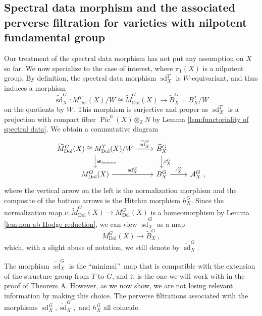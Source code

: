 \documentclass[11pt, a4paper]{amsart}
\theoremstyle{definition}
\theoremstyle{myitemstyle}
\newcommand{\mc}[1]{{\mathcal{#1}}}
\DeclareMathOperator{\Pic}{Pic}
\newcommand{\Dol}{{\mathrm{Dol}}}
\newcommand{\sd}{{\operatorname{sd}}}
\begin{document}
\subsection{Spectral data morphism and the  associated perverse filtration for varieties with nilpotent fundamental group}

Our treatment of the spectral data morphism has not put  any assumption on $X$ so far. We now specialize to the case of interest, where $\pi_1(X)$ is a nilpotent group. By definition, the spectral data morphism $\sd^T_X$ is $W$-equivariant, and thus induces a morphism 
\[
    \widetilde\sd_X^G\colon M^T_\Dol(X)/W\cong \widetilde M_{\Dol}^G(X) \rightarrow \widetilde B^G_X=B^T_X/W 
\]
on the quotients by $W$. This morphism is surjective and proper as $\sd^T_X$ is a projection with compact fiber $\Pic^0(X)\otimes_{\mathbb{Z}}N$ by Lemma \ref{lem:functoriality of spectral data}. 
We obtain a commutative diagram 
\begin{equation}
	\label{eq:spectral data diagram}
	\begin{tikzcd}
		\widetilde M^G_\Dol(X)\cong M^T_\Dol(X)/W
		\arrow[r,"\widetilde\sd^G_X"]
		\arrow[d,"\cong_{homeo}"]&
		\widetilde B^G_X
		\arrow[d,"\beta^G_X"]&\\
		M^G_\Dol(X)
		\arrow[r,"\sd^G_X"]&
		B^G_X
		\arrow[r,"\iota^G_X"]&
		\mc A^G_X\ ,
	\end{tikzcd}
\end{equation}
where the vertical arrow on the left is the normalization morphism and the composite of the bottom arrows is the Hitchin morphism $h_X^G$. 
Since the normalization map $\nu\colon \widetilde M_{\Dol}^G(X) \to M_{\Dol}^G(X)$ is a homeomorphism by Lemma \ref{lem:non-ab Hodge reduction}, we can view $\widetilde \sd^G_X$ as a map 
\[
    M_{\Dol}^G(X) \rightarrow \widetilde B^G_X\ ,
\]
which, with a slight abuse of notation, we still denote by $\widetilde \sd^G_X$.

The morphism $\widetilde \sd^G_X$ is the \textquotedblleft minimal\textquotedblright\ map that is compatible with the extension of the structure group from $T$ to $G$, and it is the one we will work with in the proof of Theorem A.
However, as we now show, we are not losing relevant information by making this choice. The perverse filtrations associated with the morphisms $\sd_X^G,\widetilde \sd_X^G,$ and $h^G_X$ all coincide.
\end{document}
